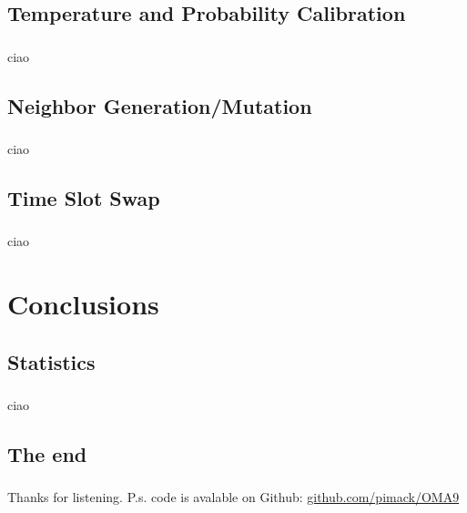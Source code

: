 \documentclass{beamer}
\begin{document}
\subsection{Temperature and Probability Calibration}

\begin{frame}
\frametitle{\insertsubsection}
ciao
\end{frame}

\subsection{Neighbor Generation/Mutation}

\begin{frame}
\frametitle{\insertsubsection}
ciao
\end{frame}

\subsection{Time Slot Swap}

\begin{frame}
\frametitle{\insertsubsection}
ciao
\end{frame}

\section{Conclusions}

\subsection{Statistics}

\begin{frame}
\frametitle{\insertsubsection}
ciao
\end{frame}

\subsection{The end}

\begin{frame}
\frametitle{\insertsubsection}
Thanks for listening.
\vfill
P.s. code is avalable on Github: \href{https://github.com/pimack/OMA9}{github.com/pimack/OMA9}
\end{frame}
\end{document}
